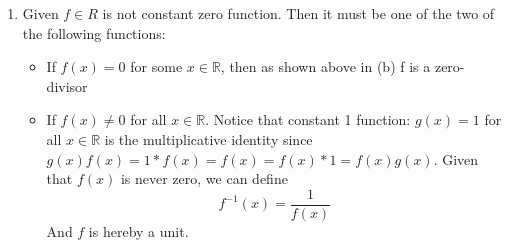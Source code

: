 \documentclass[11pt, oneside]{article}
\newcommand{\R}{\mathbb R}
\begin{document}
\begin{enumerate}
\begin{enumerate}
    \item Given $f\in R$ is not constant zero function. Then it must be one of the two of the following functions:\begin{itemize}
        \item If $f(x)=0$ for some $x\in \R$, then as shown above in (b) f is a zero-divisor
        \item If $f(x)\neq 0$ for all $x\in \R$. Notice that constant 1 function: $g(x)=1$ for all $x\in \R$ is the multiplicative identity since $g(x)f(x)=1*f(x)=f(x)=f(x)*1=f(x)g(x)$. Given that $f(x)$ is never zero, we can define 
        \[f^{-1}(x)=\dfrac{1}{f(x)}\]
        And $f$ is hereby a unit.
    \end{itemize}
    
\end{enumerate}


\end{enumerate}
\end{document}
